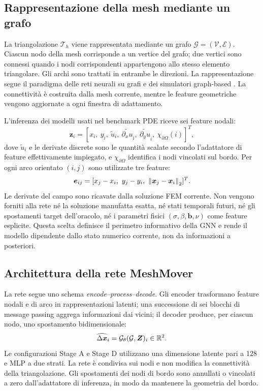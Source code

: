 \subsection{Rappresentazione della mesh mediante un grafo}

La triangolazione $\mathcal T_h$ viene rappresentata mediante un grafo $\mathcal G=(\mathcal V,\mathcal E)$. Ciascun nodo della mesh corrisponde a un vertice del grafo; due vertici sono connessi quando i nodi corrispondenti appartengono allo stesso elemento triangolare. Gli archi sono trattati in entrambe le direzioni. La rappresentazione segue il paradigma delle reti neurali su grafi e dei simulatori graph-based \citep{battaglia2018relational,pfaff2021learning}. La connettività è costruita dalla mesh corrente, mentre le feature geometriche vengono aggiornate a ogni finestra di adattamento.

L'inferenza dei modelli usati nel benchmark PDE riceve sei feature nodali:
\begin{equation}
\bm z_i=
\left[
x_i,\ y_i,\ \widetilde u_i,\ 
\widetilde{\partial_xu}_i,\ 
\widetilde{\partial_yu}_i,\ 
\chi_{\partial\Omega}(i)
\right]^T,
\label{eq:node_features}
\end{equation}
dove $\widetilde u_i$ e le derivate discrete sono le quantità scalate secondo l'adattatore di feature effettivamente impiegato, e $\chi_{\partial\Omega}$ identifica i nodi vincolati sul bordo. Per ogni arco orientato $(i,j)$ sono utilizzate tre feature:
\begin{equation}
\bm e_{ij}=
[x_j-x_i,\ y_j-y_i,\ \left\lVert \bm x_j-\bm x_i \right\rVert_2]^T.
\label{eq:edge_features}
\end{equation}
Le derivate del campo sono ricavate dalla soluzione FEM corrente. Non vengono forniti alla rete né la soluzione manufatta esatta, né stati temporali futuri, né gli spostamenti target dell'oracolo, né i parametri fisici $(\sigma,\beta,\bm b,\nu)$ come feature esplicite. Questa scelta definisce il perimetro informativo della GNN e rende il modello dipendente dallo stato numerico corrente, non da informazioni a posteriori.

\subsection{Architettura della rete MeshMover}

La rete segue uno schema \emph{encode--process--decode}. Gli encoder trasformano feature nodali e di arco in rappresentazioni latenti; una successione di sei blocchi di message passing aggrega informazioni dai vicini; il decoder produce, per ciascun nodo, uno spostamento bidimensionale:
\begin{equation}
\widehat{\Delta\bm x}_i
=
\mathcal G_\theta(\mathcal G,\bm Z)_i
\in\mathbb{R}^2.
\label{eq:gnn_output}
\end{equation}
Le configurazioni Stage A e Stage D utilizzano una dimensione latente pari a 128 e MLP a due strati. La rete è condivisa sui nodi e non modifica la connettività della triangolazione. Gli spostamenti dei nodi di bordo sono annullati o vincolati a zero dall'adattatore di inferenza, in modo da mantenere la geometria del bordo.

